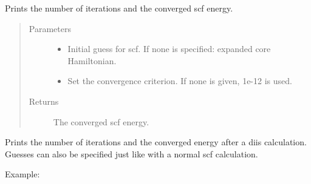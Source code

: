 \documentclass[letterpaper,10pt,english]{sphinxmanual}
\begin{document}
\begin{fulllineitems}

\begin{fulllineitems}
\label{\detokenize{Real_GHF:ghf.real_GHF.RealGHF.get_scf_solution}}
Prints the number of iterations and the converged scf energy.
\begin{quote}\begin{description}
\item[{Parameters}] \leavevmode\begin{itemize}
\item {} 
 \textendash{} Initial guess for scf. If none is specified: expanded core Hamiltonian.

\item {} 
 \textendash{} Set the convergence criterion. If none is given, 1e-12 is used.

\end{itemize}

\item[{Returns}] \leavevmode
The converged scf energy.

\end{description}\end{quote}

\end{fulllineitems}


\begin{fulllineitems}
\label{\detokenize{Real_GHF:ghf.real_GHF.RealGHF.get_scf_solution_diis}}
Prints the number of iterations and the converged energy after a diis calculation. Guesses can also be specified
just like with a normal scf calculation.

Example:


\end{fulllineitems}
\end{fulllineitems}
\end{document}
